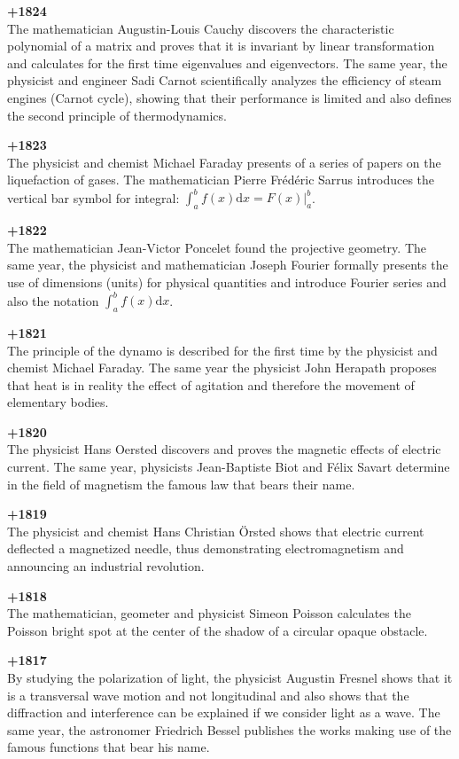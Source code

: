 \textbf{+1824}\\
The mathematician Augustin-Louis Cauchy discovers the characteristic polynomial of a matrix and proves that it is invariant by linear transformation and calculates for the first time eigenvalues and eigenvectors. The same year, the physicist and engineer Sadi Carnot scientifically analyzes the efficiency of steam engines (Carnot cycle), showing that their performance is limited and also defines the second principle of thermodynamics.

\textbf{+1823}\\
The physicist and chemist Michael Faraday presents of a series of papers on the liquefaction of gases.  The mathematician Pierre Frédéric Sarrus introduces the vertical bar symbol for integral: $\int_a^bf(x)\mathrm{d}x=F(x)|_a^b$.

\textbf{+1822}\\
The mathematician Jean-Victor Poncelet found the projective geometry. The same year, the physicist and mathematician Joseph Fourier formally presents the use of dimensions (units) for physical quantities and introduce Fourier series and also the notation $\int_a^bf(x)\mathrm{d}x$.

\textbf{+1821}\\
The principle of the dynamo is described for the first time by the physicist and chemist Michael Faraday. The same year the physicist John Herapath proposes that heat is in reality the effect of agitation and therefore the movement of elementary bodies.

\textbf{+1820}\\
The physicist Hans Oersted discovers and proves the magnetic effects of electric current. The same year, physicists Jean-Baptiste Biot and Félix Savart determine in the field of magnetism the famous law that bears their name.

\textbf{+1819}\\
The physicist and chemist Hans Christian Örsted shows that electric current deflected a magnetized needle, thus demonstrating electromagnetism and announcing an industrial revolution.

\textbf{+1818}\\
The mathematician, geometer and physicist Simeon Poisson calculates the Poisson bright spot at the center of the shadow of a circular opaque obstacle.

\textbf{+1817}\\
By studying the polarization of light, the physicist Augustin Fresnel shows that it is a transversal wave motion and not longitudinal and also shows that the diffraction and interference can be explained if we consider light as a wave. The same year, the astronomer Friedrich Bessel publishes the works making use of the famous functions that bear his name.

